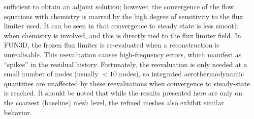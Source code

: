 sufficient to obtain an adjoint solution; however, the convergence of the flow
equations with chemistry is marred by the high degree of sensitivity to the flux
limiter used.  It can be seen in  that convergence
to
steady state is less smooth when chemistry is involved, and this is directly
tied to the flux limiter field.  In FUN3D, the frozen flux limiter is
re-evaluated when a reconstruction is unrealisable.  This reevaluation causes
high-frequency errors, which manifest as ``spikes'' in the residual history.
Fortunately, the reevaluation is only needed at a small number of nodes
(usually $< 10$ nodes), so integrated aerothermodynamic quantities are
unaffected by these reevaluations when convergence to steady-state is reached.
It should be noted that while the results presented here are only on the
coarsest (baseline) mesh level, the refined meshes also exhibit similar
behavior.

